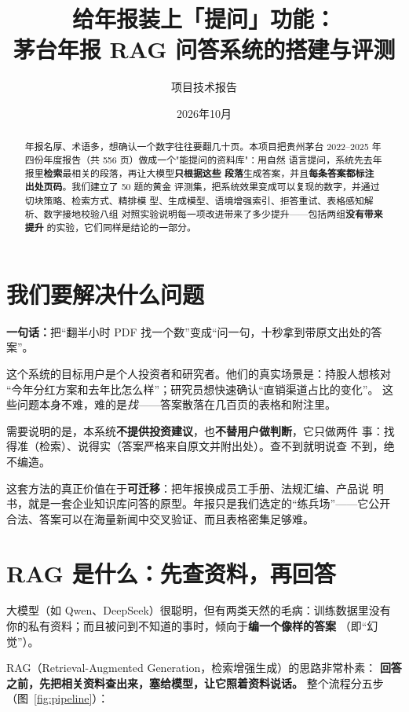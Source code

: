 \documentclass[UTF8,11pt]{ctexart}
\title{\textbf{给年报装上「提问」功能：\\茅台年报 RAG 问答系统的搭建与评测}}
\author{项目技术报告}
\date{2026年10月}
\begin{document}
\maketitle

\begin{abstract}
年报名厚、术语多，想确认一个数字往往要翻几十页。本项目把贵州茅台
2022--2025 年四份年度报告（共 556 页）做成一个"能提问的资料库"：用自然
语言提问，系统先去年报里\textbf{检索}最相关的段落，再让大模型\textbf{只根据这些
段落}生成答案，并且\textbf{每条答案都标注出处页码}。我们建立了 50 题的黄金
评测集，把系统效果变成可以复现的数字，并通过切块策略、检索方式、精排模
型、生成模型、语境增强索引、拒答重试、表格感知解析、数字接地校验八组
对照实验说明每一项改进带来了多少提升——包括两组\textbf{没有带来提升}
的实验，它们同样是结论的一部分。
\end{abstract}

\tableofcontents

\section{我们要解决什么问题}

\textbf{一句话：}把``翻半小时 PDF 找一个数''变成``问一句，十秒拿到带原文出处的答案''。

这个系统的目标用户是个人投资者和研究者。他们的真实场景是：持股人想核对
``今年分红方案和去年比怎么样''；研究员想快速确认``直销渠道占比的变化''。
这些问题本身不难，难的是\emph{找}——答案散落在几百页的表格和附注里。

需要说明的是，本系统\textbf{不提供投资建议}，也\textbf{不替用户做判断}，它只做两件
事：找得准（检索）、说得实（答案严格来自原文并附出处）。查不到就明说查
不到，绝不编造。

这套方法的真正价值在于\textbf{可迁移}：把年报换成员工手册、法规汇编、产品说
明书，就是一套企业知识库问答的原型。年报只是我们选定的``练兵场''——它公开
合法、答案可以在海量新闻中交叉验证、而且表格密集足够难。

\section{RAG 是什么：先查资料，再回答}

大模型（如 Qwen、DeepSeek）很聪明，但有两类天然的毛病：训练数据里没有
你的私有资料；而且被问到不知道的事时，倾向于\textbf{编一个像样的答案}
（即``幻觉''）。

RAG（Retrieval-Augmented Generation，检索增强生成）的思路非常朴素：
\textbf{回答之前，先把相关资料查出来，塞给模型，让它照着资料说话。}
整个流程分五步（图~\ref{fig:pipeline}）：
\end{document}
